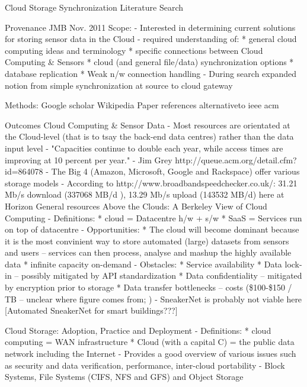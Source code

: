Cloud Storage Synchronization Literature Search

Provenance
	JMB
	Nov. 2011
	Scope: 
		- Interested in determining current solutions for storing sensor data in the Cloud
		- required understanding of:
			* general cloud computing ideas and terminology
			* specific connections between Cloud Computing & Sensors
			* cloud (and general file/data) synchronization options
			* database replication
			* Weak n/w connection handling
		- During search expanded notion from simple synchronization at source to cloud gateway

	Methods:
			Google scholar
			Wikipedia
			Paper references
			alternativeto
			ieee
			acm

Outcomes			
	Cloud Computing & Sensor Data
		- Most resources are orientated at the Cloud-level (that is to tsay the back-end data centres) rather than the data input level
		- "Capacities continue to double each year, while access times are improving at 10 percent per year." - Jim Grey http://queue.acm.org/detail.cfm?id=864078
		- The Big 4 (Amazon, Microsoft, Google and Rackspace) offer various storage models
		- According to http://www.broadbandspeedchecker.co.uk/: 31.21 Mb/s download (337068 MB/d ), 13.29 Mb/s upload (143532 MB/d) here at Horizon
		General resources
			Above the Clouds: A Berkeley View of Cloud Computing
				- Definitions: 	* cloud = Datacentre h/w + s/w
								* SaaS = Services run on top of datacentre
				- Opportunities:	* The cloud will become dominant because it is the most convinient way to store automated (large) datasets from sensors and users -- services can then process, analyse and mashup the highly available data 
									* infinite capacity on-demand
				- Obstacles:	* Service availability
								* Data lock-in -- possibly mitigated by API standardization
								* Data confidentiality -- mitigated by encryption prior to storage
								* Data transfer bottlenecks -- costs (\$100-\$150 / TB -- unclear where figure comes from; )
																- SneakerNet is probably not viable here [Automated SneakerNet for smart buildings???]
			
			Cloud Storage: Adoption, Practice and Deployment
				- Definitions: 	* cloud computing = WAN infrastructure
								* Cloud (with a capital C) = the public data network including the Internet
				- Provides a good overview of various issues such as security and data verification, performance, inter-cloud portability
				- Block Systems, File Systems (CIFS, NFS and GFS) and Object Storage				

